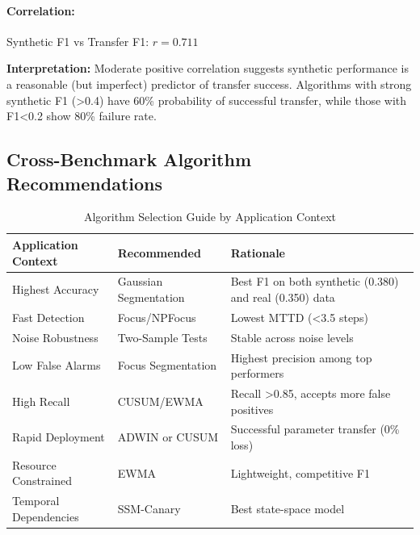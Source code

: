 \documentclass[journal,article,submit,pdftex,moreauthors]{Definitions/mdpi}
\begin{document}
\paragraph{Correlation:} Synthetic F1 vs Transfer F1: $r = 0.711$

\textbf{Interpretation:} Moderate positive correlation suggests synthetic performance is a reasonable (but imperfect) predictor of transfer success. Algorithms with strong synthetic F1 (>0.4) have 60\% probability of successful transfer, while those with F1<0.2 show 80\% failure rate.


\subsection{Cross-Benchmark Algorithm Recommendations}
\label{sec:recommendations}

\begin{table}[ht]
\centering
\caption{Algorithm Selection Guide by Application Context}
\label{tab:algorithm_guide}
\small
\begin{tabular}{p{4cm}p{4cm}p{5cm}}
\toprule
\textbf{Application Context} & \textbf{Recommended} & \textbf{Rationale} \\
\midrule
Highest Accuracy & Gaussian Segmentation & Best F1 on both synthetic (0.380) and real (0.350) data \\
Fast Detection & Focus/NPFocus & Lowest MTTD (<3.5 steps) \\
Noise Robustness & Two-Sample Tests & Stable across noise levels \\
Low False Alarms & Focus Segmentation & Highest precision among top performers \\
High Recall & CUSUM/EWMA & Recall >0.85, accepts more false positives \\
Rapid Deployment & ADWIN or CUSUM & Successful parameter transfer (0\% loss) \\
Resource Constrained & EWMA & Lightweight, competitive F1 \\
Temporal Dependencies & SSM-Canary & Best state-space model \\
\bottomrule
\end{tabular}
\end{table}






\end{document}
